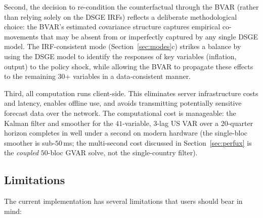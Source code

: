 \documentclass[11pt]{article}
\theoremstyle{definition}
\theoremstyle{remark}
\begin{document}
Second, the decision to re-condition the counterfactual through the
BVAR (rather than relying solely on the DSGE IRFs) reflects a
deliberate methodological choice: the BVAR's estimated covariance
structure captures empirical co-movements that may be absent from or
imperfectly captured by any single DSGE model.  The IRF-consistent
mode (Section~\ref{sec:modes}c) strikes a balance by using the DSGE
model to identify the responses of key variables (inflation, output)
to the policy shock, while allowing the BVAR to propagate these
effects to the remaining 30+ variables in a data-consistent manner.

Third, all computation runs client-side.  This eliminates server
infrastructure costs and latency, enables offline use, and avoids
transmitting potentially sensitive forecast data over the network.
The computational cost is manageable: the Kalman filter and smoother
for the $41$-variable, $3$-lag US VAR over a 20-quarter horizon completes in
well under a second on modern hardware (the single-bloc smoother is
sub-$50$\,ms; the multi-second cost discussed in
Section~\ref{sec:perfux} is the \emph{coupled} $50$-bloc GVAR solve, not
the single-country filter).

\subsection{Limitations}

The current implementation has several limitations that users should
bear in mind:
\end{document}
